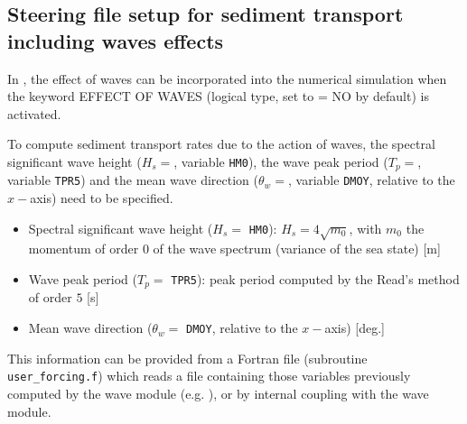 \subsection{Steering file setup for sediment transport including waves effects}
In \gaia{}, the effect of waves can be incorporated into the numerical simulation when the keyword
 {\ttfamily EFFECT OF WAVES} (logical type, set to {\ttfamily = NO} by default) is activated.

 To compute sediment transport rates due to the action of waves, the spectral significant wave height ($H_s =$, variable \texttt{HM0}), the wave peak period ($T_p =$, variable \texttt{TPR5}) and the mean wave direction ($\theta_w =$, variable \texttt{DMOY}, relative to the $x-$axis) need to be specified.

 \begin{itemize}
\item Spectral significant wave height ($H_s =$ \texttt{HM0}): $H_s=4\sqrt{m_0}$, with $m_0$ the momentum of order $0$ of the wave spectrum (variance of the sea state) [m]
\vspace{0.2cm}
\item Wave peak period ($T_p =$ \texttt{TPR5}): peak period computed by the Read's method of order $5$ [s]
\vspace{0.2cm}
\item Mean wave direction ($\theta_w =$ \texttt{DMOY}, relative to the $x-$axis) [deg.]
\end{itemize}

 This information can be provided from a Fortran file (subroutine \texttt{user\_forcing.f}) which reads a file containing those variables previously computed by the wave module (e.g. \tomawac{}), or by internal coupling with the wave module.
